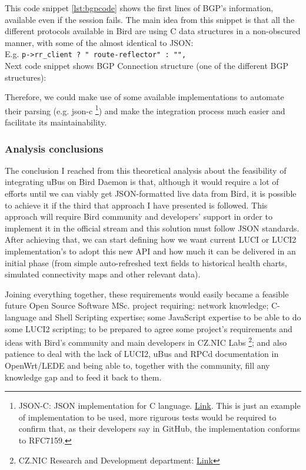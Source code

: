 \begin{enumerate}


This code snippet \ref{lst:bgpcode} shows the first lines of BGP's information, available even if the session fails. The main idea from this snippet is that all the different protocols available in Bird are using C data structures in a non-obscured manner, with some of the almost identical to JSON:\\E.g. \texttt{p->rr\_client ? " route-reflector" : "",}\\Next code snippet shows BGP Connection structure (one of the different BGP structures):



Therefore, we could make use of some available implementations to automate their parsing (e.g. json-c \footnote{JSON-C: JSON implementation for C language. \href{https://github.com/json-c/json-c}{Link}. This is just an example of implementation to be used, more rigurous tests would be required to confirm that, as their developers say in GitHub, the implementation conforms to RFC7159.}) and make the integration process much easier and facilitate its maintainability.
\end{enumerate}


\subsubsection{Analysis conclusions}
The conclusion I reached from this theoretical analysis about the feasibility of integrating uBus on Bird Daemon is that, although it would require a lot of efforts until we can viably get JSON-formatted live data from Bird, it is possible to achieve it if the third that approach I have presented is followed. This approach will require Bird community and developers' support in order to implement it in the official stream and this solution must follow JSON standards. After achieving that, we can start defining how we want current LUCI or LUCI2 implementation's to adopt this new API and how much it can be delivered in an initial phase (from simple auto-refreshed text fields to historical health charts, simulated connectivity maps and other relevant data).

Joining everything together, these requirements would easily  became a feasible future Open Source Software MSc. project requiring: network knowledge; C-language and Shell Scripting expertise; some JavaScript expertise to be able to do some LUCI2 scripting; to be prepared to agree some project's requirements and ideas with Bird's community and main developers in CZ.NIC Labs \footnote{CZ.NIC Research and Development department: \href{https://labs.nic.cz/en/}{Link}}; and also patience to deal with the lack of LUCI2, uBus and RPCd documentation in OpenWrt/LEDE and being able to, together with the community, fill any knowledge gap and to feed it back to them.

\newpage